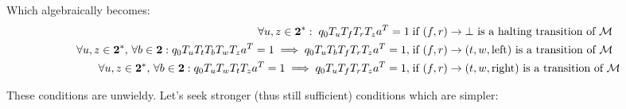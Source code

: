 Which algebraically becomes:
\begin{align*}
  \forall u,z\in\mathbf{2}^*: \; q_0 T_u T_f T_r T_z a^T = 1 \;                                                                              & \text{if $(f,r) \to \bot$ is a halting transition of $\mathcal{M}$}
  \\
  \forall u,z\in\mathbf{2}^*,\,\forall b \in \mathbf{2}: q_0 T_{u} T_t T_b T_w T_{z} a^T = 1 \implies q_0 T_{u} T_b T_f T_r T_{z} a^T = 1,\; & \text{if $(f,r) \to (t,w,\text{left})$ is a transition of $\mathcal{M}$}
  \\
  \forall u,z\in\mathbf{2}^*,\,\forall b \in \mathbf{2}: q_0 T_{u} T_w T_t T_{z} a^T = 1 \implies q_0 T_{u} T_f T_r T_{z} a^T = 1,\;         & \text{if $(f,r) \to (t,w,\text{right})$ is a transition of $\mathcal{M}$}
\end{align*}

These conditions are unwieldy. Let's seek stronger (thus still sufficient) conditions which are simpler:

